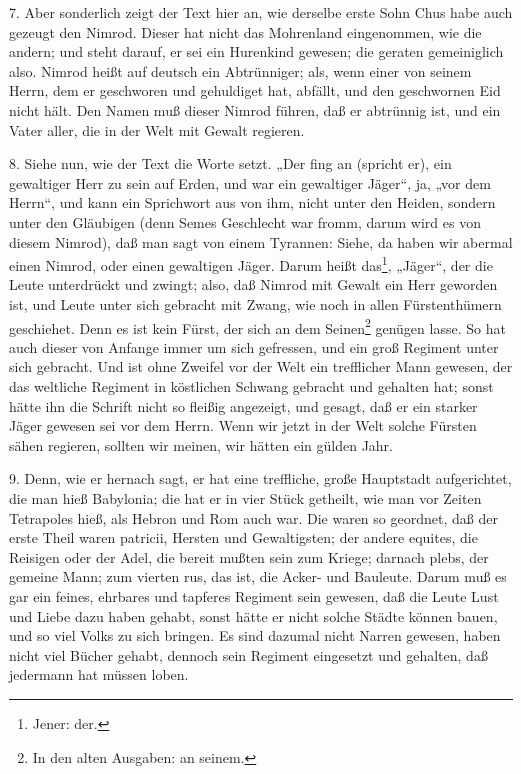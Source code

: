 7. Aber sonderlich zeigt der Text hier an, wie derselbe erste Sohn Chus habe auch gezeugt den Nimrod. Dieser hat nicht das Mohrenland eingenommen, wie die andern; und steht darauf, er sei ein Hurenkind gewesen; die geraten gemeiniglich also. Nimrod heißt auf deutsch ein Abtrünniger; als, wenn einer von seinem Herrn, dem er geschworen und gehuldiget hat, abfällt, und den geschwornen Eid nicht hält. Den Namen muß dieser Nimrod führen, daß er abtrünnig ist, und ein Vater aller, die in der Welt mit Gewalt regieren.

8. Siehe nun, wie der Text die Worte setzt. „Der fing an (spricht er), ein gewaltiger Herr zu sein auf Erden, und war ein gewaltiger Jäger“, ja, „vor dem Herrn“, und kann ein Sprichwort aus von ihm, nicht unter den Heiden, sondern unter den Gläubigen (denn Semes Geschlecht war fromm, darum wird es von diesem Nimrod), daß man sagt von einem Tyrannen: Siehe, da haben wir abermal einen Nimrod, oder einen gewaltigen Jäger. Darum heißt das\footnote{Jener: der.}, „Jäger“, der die Leute unterdrückt und zwingt; also, daß Nimrod mit Gewalt ein Herr geworden ist, und Leute unter sich gebracht mit Zwang, wie noch in allen Fürstenthümern geschiehet. Denn es ist kein Fürst, der sich an dem Seinen\footnote{In den alten Ausgaben: an seinem.} genügen lasse. So hat auch dieser von Anfange immer um sich gefressen, und ein groß Regiment unter sich gebracht. Und ist ohne Zweifel vor der Welt ein trefflicher Mann gewesen, der das weltliche Regiment in köstlichen Schwang gebracht und gehalten hat; sonst hätte ihn die Schrift nicht so fleißig angezeigt, und gesagt, daß er ein starker Jäger gewesen sei vor dem Herrn. Wenn wir jetzt in der Welt solche Fürsten sähen regieren, sollten wir meinen, wir hätten ein gülden Jahr.

9. Denn, wie er hernach sagt, er hat eine treffliche, große Hauptstadt aufgerichtet, die man hieß Babylonia; die hat er in vier Stück getheilt, wie man vor Zeiten Tetrapoles hieß, als Hebron und Rom auch war. Die waren so geordnet, daß der erste Theil waren patricii, Hersten und Gewaltigsten; der andere equites, die Reisigen oder der Adel, die bereit mußten sein zum Kriege; darnach plebs, der gemeine Mann; zum vierten rus, das ist, die Acker- und Bauleute. Darum muß es gar ein feines, ehrbares und tapferes Regiment sein gewesen, daß die Leute Lust und Liebe dazu haben gehabt, sonst hätte er nicht solche Städte können bauen, und so viel Volks zu sich bringen. Es sind dazumal nicht Narren gewesen, haben nicht viel Bücher gehabt, dennoch sein Regiment eingesetzt und gehalten, daß jedermann hat müssen loben.

